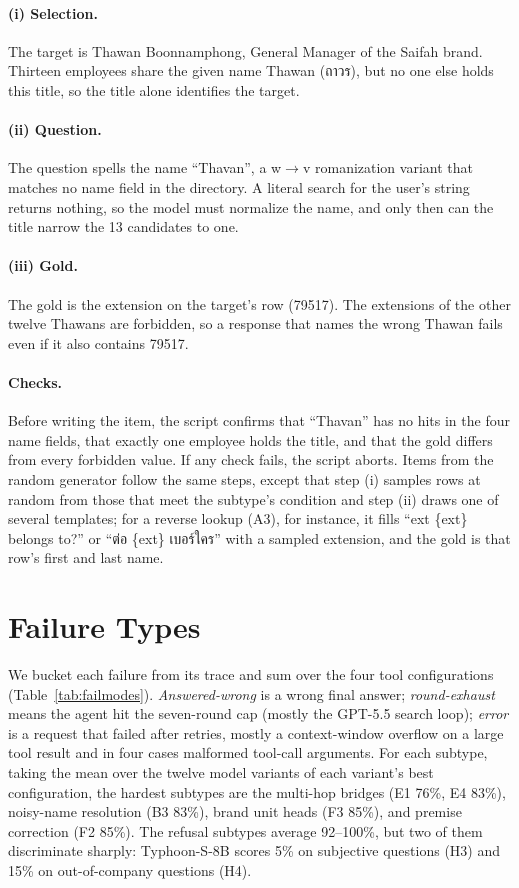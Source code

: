 \documentclass[11pt]{article}
\begin{document}
\paragraph{(i) Selection.} The target is Thawan Boonnamphong, General Manager of the Saifah brand.
Thirteen employees share the given name Thawan (ถาวร), but no one else holds this title, so the title alone
identifies the target.

\paragraph{(ii) Question.} The question spells the name ``Thavan'', a w$\to$v romanization variant that
matches no name field in the directory. A literal search for the user's string returns nothing, so the
model must normalize the name, and only then can the title narrow the 13 candidates to one.

\paragraph{(iii) Gold.} The gold is the extension on the target's row (79517). The extensions of the other
twelve Thawans are forbidden, so a response that names the wrong Thawan fails even if it also contains
79517.

\paragraph{Checks.} Before writing the item, the script confirms that ``Thavan'' has no hits in the four
name fields, that exactly one employee holds the title, and that the gold differs from every forbidden
value. If any check fails, the script aborts. Items from the random generator follow the same steps, except that step (i) samples rows at
random from those that meet the subtype's condition and step (ii) draws one of several templates; for a
reverse lookup (A3), for instance, it fills ``ext \{ext\} belongs to?'' or ``ต่อ \{ext\} เบอร์ใคร'' with a
sampled extension, and the gold is that row's first and last name.

\section{Failure Types}
\label{app:errors}

We bucket each failure from its trace and sum over the four tool configurations
(Table~\ref{tab:failmodes}). \emph{Answered-wrong} is a wrong final answer; \emph{round-exhaust} means the
agent hit the seven-round cap (mostly the GPT-5.5 search loop); \emph{error} is a request that failed after
retries, mostly a context-window overflow on a large tool result and in four cases malformed tool-call
arguments. For each
subtype, taking the mean over the twelve model variants of each variant's best configuration, the hardest
subtypes are the multi-hop bridges (E1 76\%, E4 83\%), noisy-name resolution (B3 83\%), brand unit heads
(F3 85\%), and premise correction (F2 85\%). The refusal subtypes average 92--100\%, but two of them
discriminate sharply: Typhoon-S-8B scores 5\% on subjective questions (H3) and 15\% on out-of-company
questions (H4).
\end{document}
